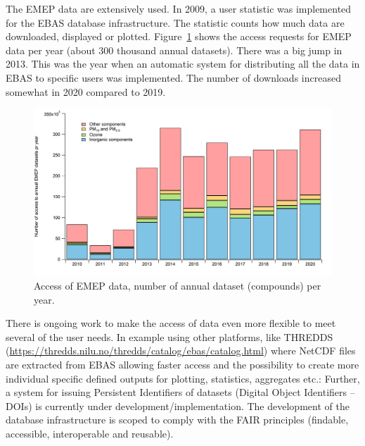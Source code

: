 The EMEP data are extensively used. In 2009, a user statistic was implemented for the EBAS database infrastructure.  
The statistic counts how much data are downloaded, displayed or plotted. Figure~\ref{fig:downloads} shows the access requests for EMEP data per year (about 300 thousand annual datasets). There was a big jump in 2013. This was the year when an automatic system for distributing all the data in EBAS to specific users was implemented. The number of downloads increased somewhat in 2020 compared to 2019. 

\begin{figure}[h]
\centering
\includegraphics[width=0.6\paperwidth]{FIGS_Obs/downloaded.png}
\caption{\label{fig:downloads}Access of EMEP data, number of annual dataset (compounds) per year.}
 \end{figure}

There is ongoing work to make the  access of data even more flexible to meet several of the user needs. In example using other platforms, like THREDDS (\url{https://thredds.nilu.no/thredds/catalog/ebas/catalog.html}) where NetCDF files are extracted from EBAS allowing faster access and the possibility to create more individual specific defined outputs for plotting, statistics, aggregates etc.: Further, a system for issuing Persistent Identifiers of datasets (Digital Object Identifiers – DOIs) is currently under development/implementation. The development of the database infrastructure is scoped to comply with the FAIR principles (findable, accessible, interoperable and reusable).

\clearpage
\renewcommand\bibname{References}      %
%

